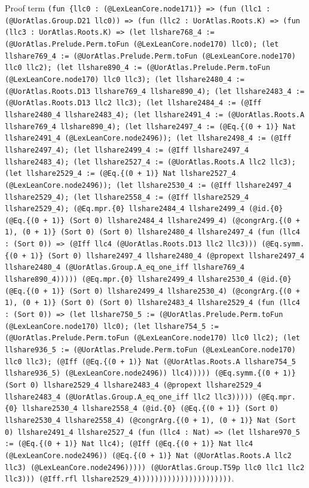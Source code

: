 \documentclass[11pt]{article}
\begin{document}
\noindent Proof term \texttt{(fun \{llc0 : (@LexLeanCore.node171)\} => (fun (llc1 : (@UorAtlas.Group.D21 llc0)) => (fun (llc2 : UorAtlas.Roots.K) => (fun (llc3 : UorAtlas.Roots.K) => (let llshare768\_4 := (@UorAtlas.Prelude.Perm.toFun (@LexLeanCore.node170) llc0); (let llshare769\_4 := (@UorAtlas.Prelude.Perm.toFun (@LexLeanCore.node170) llc0 llc2); (let llshare890\_4 := (@UorAtlas.Prelude.Perm.toFun (@LexLeanCore.node170) llc0 llc3); (let llshare2480\_4 := (@UorAtlas.Roots.D13 llshare769\_4 llshare890\_4); (let llshare2483\_4 := (@UorAtlas.Roots.D13 llc2 llc3); (let llshare2484\_4 := (@Iff llshare2480\_4 llshare2483\_4); (let llshare2491\_4 := (@UorAtlas.Roots.A llshare769\_4 llshare890\_4); (let llshare2497\_4 := (@Eq.\{(0 + 1)\} Nat llshare2491\_4 (@LexLeanCore.node2496)); (let llshare2498\_4 := (@Iff llshare2497\_4); (let llshare2499\_4 := (@Iff llshare2497\_4 llshare2483\_4); (let llshare2527\_4 := (@UorAtlas.Roots.A llc2 llc3); (let llshare2529\_4 := (@Eq.\{(0 + 1)\} Nat llshare2527\_4 (@LexLeanCore.node2496)); (let llshare2530\_4 := (@Iff llshare2497\_4 llshare2529\_4); (let llshare2558\_4 := (@Iff llshare2529\_4 llshare2529\_4); (@Eq.mpr.\{0\} llshare2484\_4 llshare2499\_4 (@id.\{0\} (@Eq.\{(0 + 1)\} (Sort 0) llshare2484\_4 llshare2499\_4) (@congrArg.\{(0 + 1), (0 + 1)\} (Sort 0) (Sort 0) llshare2480\_4 llshare2497\_4 (fun (llc4 : (Sort 0)) => (@Iff llc4 (@UorAtlas.Roots.D13 llc2 llc3))) (@Eq.symm.\{(0 + 1)\} (Sort 0) llshare2497\_4 llshare2480\_4 (@propext llshare2497\_4 llshare2480\_4 (@UorAtlas.Group.A\_eq\_one\_iff llshare769\_4 llshare890\_4))))) (@Eq.mpr.\{0\} llshare2499\_4 llshare2530\_4 (@id.\{0\} (@Eq.\{(0 + 1)\} (Sort 0) llshare2499\_4 llshare2530\_4) (@congrArg.\{(0 + 1), (0 + 1)\} (Sort 0) (Sort 0) llshare2483\_4 llshare2529\_4 (fun (llc4 : (Sort 0)) => (let llshare750\_5 := (@UorAtlas.Prelude.Perm.toFun (@LexLeanCore.node170) llc0); (let llshare754\_5 := (@UorAtlas.Prelude.Perm.toFun (@LexLeanCore.node170) llc0 llc2); (let llshare936\_5 := (@UorAtlas.Prelude.Perm.toFun (@LexLeanCore.node170) llc0 llc3); (@Iff (@Eq.\{(0 + 1)\} Nat (@UorAtlas.Roots.A llshare754\_5 llshare936\_5) (@LexLeanCore.node2496)) llc4))))) (@Eq.symm.\{(0 + 1)\} (Sort 0) llshare2529\_4 llshare2483\_4 (@propext llshare2529\_4 llshare2483\_4 (@UorAtlas.Group.A\_eq\_one\_iff llc2 llc3))))) (@Eq.mpr.\{0\} llshare2530\_4 llshare2558\_4 (@id.\{0\} (@Eq.\{(0 + 1)\} (Sort 0) llshare2530\_4 llshare2558\_4) (@congrArg.\{(0 + 1), (0 + 1)\} Nat (Sort 0) llshare2491\_4 llshare2527\_4 (fun (llc4 : Nat) => (let llshare970\_5 := (@Eq.\{(0 + 1)\} Nat llc4); (@Iff (@Eq.\{(0 + 1)\} Nat llc4 (@LexLeanCore.node2496)) (@Eq.\{(0 + 1)\} Nat (@UorAtlas.Roots.A llc2 llc3) (@LexLeanCore.node2496))))) (@UorAtlas.Group.T59p llc0 llc1 llc2 llc3))) (@Iff.rfl llshare2529\_4))))))))))))))))))))))}.\par
\end{document}
